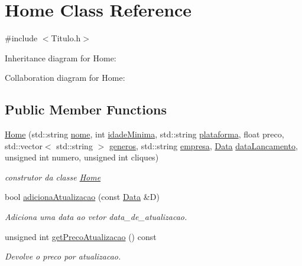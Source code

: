 \hypertarget{class_home}{}\section{Home Class Reference}
\label{class_home}


{\ttfamily \#include $<$Titulo.\+h$>$}



Inheritance diagram for Home\+:


Collaboration diagram for Home\+:
\subsection*{Public Member Functions}
\begin{DoxyCompactItemize}
\item 
\mbox{\hyperlink{class_home_aea37c4a72119815e8e0a83b63f345cc9}{Home}} (std\+::string \mbox{\hyperlink{class_titulo_a8abdf1fc6d4fc14be20bbec247664d83}{nome}}, int \mbox{\hyperlink{class_titulo_a28891078f53fc3317de60ae739514955}{idade\+Minima}}, std\+::string \mbox{\hyperlink{class_titulo_a67761eb7f006453ab0869e4b7c0a9c0b}{plataforma}}, float preco, std\+::vector$<$ std\+::string $>$ \mbox{\hyperlink{class_titulo_a3209265c8534416978ee9891b96c14b2}{generos}}, std\+::string \mbox{\hyperlink{class_titulo_a91510c440dc8583d60d88ea02f4eb1b6}{empresa}}, \mbox{\hyperlink{class_data}{Data}} \mbox{\hyperlink{class_titulo_ae540ddf2c607eb0e4de29eb8c0cca7f0}{data\+Lancamento}}, unsigned int numero, unsigned int cliques)
\begin{DoxyCompactList}\small\item\em construtor da classe \mbox{\hyperlink{class_home}{Home}} \end{DoxyCompactList}\item 
bool \mbox{\hyperlink{class_home_a94aec68b520d98ac38c6794b5771cd53}{adiciona\+Atualizacao}} (const \mbox{\hyperlink{class_data}{Data}} \&D)
\begin{DoxyCompactList}\small\item\em Adiciona uma data ao vetor data\+\_\+de\+\_\+atualizacao. \end{DoxyCompactList}\item 
unsigned int \mbox{\hyperlink{class_home_a52f37198fb17a321dbcac93d1c35b537}{get\+Preco\+Atualizacao}} () const
\begin{DoxyCompactList}\small\item\em Devolve o preco por atualizacao. \end{DoxyCompactList}\item 

\end{DoxyCompactItemize}
